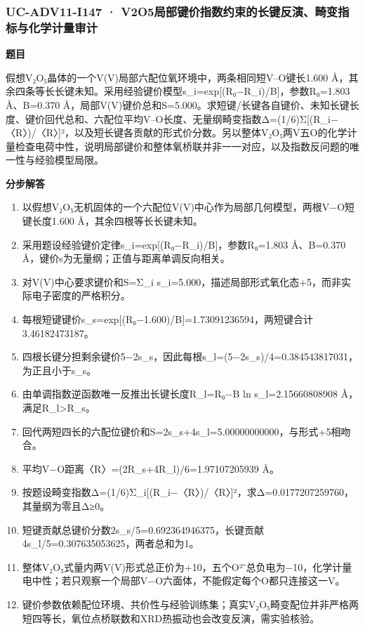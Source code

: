 \documentclass[UTF8,11pt,a4paper]{ctexart}
\begin{document}
\subsubsection*{UC-ADV11-I147 · V2O5局部键价指数约束的长键反演、畸变指标与化学计量审计}
\noindent\textbf{题目}\par
假想V₂O₅晶体的一个V(V)局部六配位氧环境中，两条相同短V–O键长1.600 Å，其余四条等长长键未知。采用经验键价模型s\_i=exp[(R₀−R\_i)/B]，参数R₀=1.803 Å、B=0.370 Å，局部V(V)键价总和S=5.000。求短键/长键各自键价、未知长键长度、键价回代总和、六配位平均V–O长度、无量纲畸变指数Δ=(1/6)Σ[(R\_i−〈R〉)/〈R〉]²，以及短长键各贡献的形式价分数。另以整体V₂O₅两V五O的化学计量检查电荷中性，说明局部键价和整体氧桥联并非一一对应，以及指数反问题的唯一性与经验模型局限。\par
\medskip\noindent\textbf{分步解答}
\begin{enumerate}
\item 以假想V₂O₅无机固体的一个六配位V(V)中心作为局部几何模型，两根V−O短键长度1.600 Å，其余四根等长长键未知。
\item 采用题设经验键价定律s\_i=exp[(R₀−R\_i)/B]，参数R₀=1.803 Å、B=0.370 Å，键价s为无量纲；正值与距离单调反向相关。
\item 对V(V)中心要求键价和S=Σ\_i s\_i=5.000，描述局部形式氧化态+5，而非实际电子密度的严格积分。
\item 每根短键键价s\_s=exp[(R₀−1.600)/B]=1.73091236594，两短键合计3.46182473187。
\item 四根长键分担剩余键价5−2s\_s，因此每根s\_l=(5−2s\_s)/4=0.384543817031，为正且小于s\_s。
\item 由单调指数逆函数唯一反推出长键长度R\_l=R₀−B ln s\_l=2.15660808908 Å，满足R\_l>R\_s。
\item 回代两短四长的六配位键价和S=2s\_s+4s\_l=5.00000000000，与形式+5相吻合。
\item 平均V−O距离〈R〉=(2R\_s+4R\_l)/6=1.97107205939 Å。
\item 按题设畸变指数Δ=(1/6)Σ\_i[(R\_i−〈R〉)/〈R〉]²，求Δ=0.0177207259760，其量纲为零且Δ≥0。
\item 短键贡献总键价分数2s\_s/5=0.692364946375，长键贡献4s\_l/5=0.307635053625，两者总和为1。
\item 整体V₂O₅式量内两V(V)形式总正价为+10，五个O²⁻总负电为−10，化学计量电中性；若只观察一个局部V−O六面体，不能假定每个O都只连接这一V。
\item 键价参数依赖配位环境、共价性与经验训练集；真实V₂O₅畸变配位并非严格两短四等长，氧位点桥联数和XRD热振动也会改变反演，需实验核验。
\end{enumerate}
\end{document}
